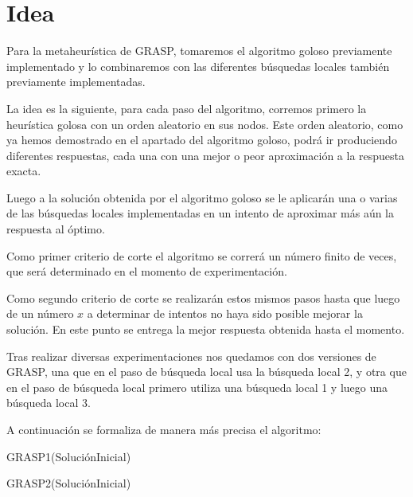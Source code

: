\section{Idea}


Para la metaheurística de GRASP, tomaremos el algoritmo goloso previamente implementado y lo combinaremos con las diferentes búsquedas locales también previamente implementadas.

La idea es la siguiente, para cada paso del algoritmo, corremos primero la heurística golosa con un orden aleatorio en sus nodos. Este orden aleatorio, como ya hemos demostrado en el apartado del algoritmo goloso, podrá ir produciendo diferentes respuestas, cada una con una mejor o peor aproximación a la respuesta exacta.

Luego a la solución obtenida por el algoritmo goloso se le aplicarán una o varias de las búsquedas locales implementadas en un intento de aproximar más aún la respuesta al óptimo.

Como primer criterio de corte el algoritmo se correrá un número finito de veces, que será determinado en el momento de experimentación.

Como segundo criterio de corte se realizarán estos mismos pasos hasta que luego de un número $x$ a determinar de intentos no haya sido posible mejorar la solución. En este punto se entrega la mejor respuesta obtenida hasta el momento.

Tras realizar diversas experimentaciones nos quedamos con dos versiones de GRASP, una que en el paso de búsqueda local usa la búsqueda local 2, y otra que en el paso de búsqueda local primero utiliza una búsqueda local 1 y luego una búsqueda local 3.

A continuación se formaliza de manera más precisa el algoritmo:

\begin{algorithm}
  	\begin{algorithmic}[1]\parskip=1mm
		 \caption{ GRASP1(SoluciónInicial) }
	\end{algorithmic}
\end{algorithm}

\begin{algorithm}
  	\begin{algorithmic}[1]\parskip=1mm
		 \caption{ GRASP2(SoluciónInicial) }
	\end{algorithmic}
\end{algorithm}


